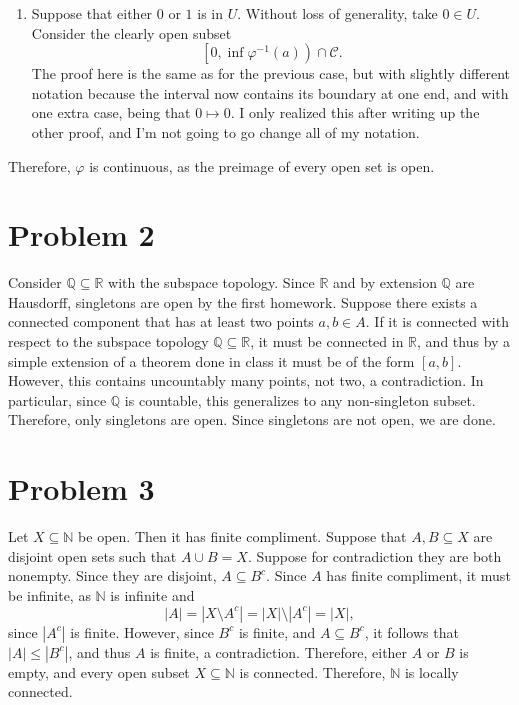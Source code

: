 \documentclass[11pt, letterpaper]{article}
\begin{document}
\begin{enumerate}
	\item Suppose that either $0$ or $1$ is in $U$. Without loss of generality, take $0\in U$. Consider the clearly open subset
		\[
			\left[ 0,\inf \varphi ^{-1} (a)\right) \cap \mathcal{C} 
		.\]
		The proof here is the same as for the previous case, but with slightly different notation because the interval now contains its boundary at one end, and with one extra case, being that $0\mapsto 0$. I only realized this after writing up the other proof, and I'm not going to go change all of my notation.
\end{enumerate}
Therefore, $\varphi $ is continuous, as the preimage of every open set is open.
\section*{Problem 2}
Consider $\mathbb{Q} \subseteq \mathbb{R} $ with the subspace topology. Since $\mathbb{R} $ and by extension $\mathbb{Q} $ are Hausdorff, singletons are open by the first homework. Suppose there exists a connected component that has at least two points $a,b\in A$. If it is connected with respect to the subspace topology $\mathbb{Q} \subseteq \mathbb{R} $, it must be connected in $\mathbb{R} $, and thus by a simple extension of a theorem done in class it must be of the form $[a,b]$. However, this contains uncountably many points, not two, a contradiction. In particular, since $\mathbb{Q} $ is countable, this generalizes to any non-singleton subset. Therefore, only singletons are open. Since singletons are not open, we are done.
\section*{Problem 3}
Let $X\subseteq \mathbb{N} $ be open. Then it has finite compliment. Suppose that $A,B\subseteq X$ are disjoint open sets such that $A \cup B=X $. Suppose for contradiction they are both nonempty. Since they are disjoint, $A\subseteq B^{c} $. Since $A$ has finite compliment, it must be infinite, as $\mathbb{N} $ is infinite and
\[
	\left| A  \right| =\left| X\setminus A^{c}  \right| =\left| X \right| \setminus \left| A^{c}  \right| =\left| X \right| 
,\]
since $\left| A^{c}  \right| $ is finite. However, since $B^{c} $ is finite, and $A\subseteq B^{c} $, it follows that $\left| A \right| \leq \left| B^{c}  \right| $, and thus $A$ is finite, a contradiction. Therefore, either $A$ or $B$ is empty, and every open subset $X\subseteq \mathbb{N} $ is connected. Therefore, $\mathbb{N} $ is locally connected.
\end{document}
